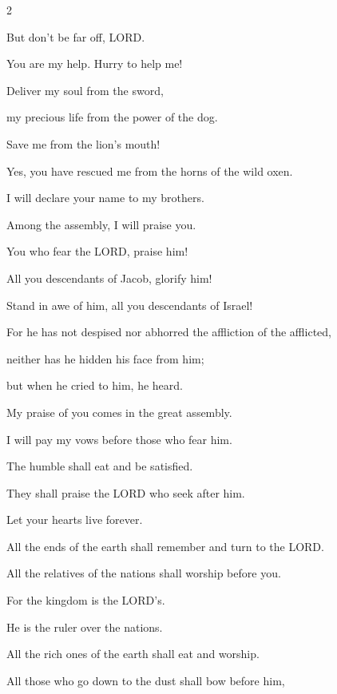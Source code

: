 \begin{multicols}{2}
	\vspace{\baselineskip}
	
	\myverse{}But don’t be far off, LORD.
	
	You are my help. Hurry to help me!
	
	
	\myverse{}Deliver my soul from the sword,
	
	my precious life from the power of the dog.
	
	
	\myverse{}Save me from the lion’s mouth!
	
	Yes, you have rescued me from the horns of the wild oxen.
	
	\vspace{\baselineskip}
	
	\myverse{}I will declare your name to my brothers.
	
	Among the assembly, I will praise you.
	
	
	\myverse{}You who fear the LORD, praise him!
	
	All you descendants of Jacob, glorify him!
	
	Stand in awe of him, all you descendants of Israel!
	
	
	\myverse{}For he has not despised nor abhorred the affliction of the
	afflicted,
	
	neither has he hidden his face from him;
	
	but when he cried to him, he heard.
	
	\vspace{\baselineskip}
	
	\myverse{}My praise of you comes in the great assembly.
	
	I will pay my vows before those who fear him.
	
	
	\myverse{}The humble shall eat and be satisfied.
	
	They shall praise the LORD who seek after him.
	
	Let your hearts live forever.
	
	
	\myverse{}All the ends of the earth shall remember and turn to the LORD.
	
	All the relatives of the nations shall worship before you.
	
	
	\myverse{}For the kingdom is the LORD’s.
	
	He is the ruler over the nations.
	
	
	\myverse{}All the rich ones of the earth shall eat and worship.
	
	All those who go down to the dust shall bow before him,
	

\end{multicols}
